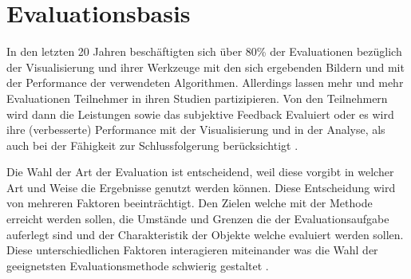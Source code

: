 \documentclass[draft=false
              ,paper=a4
              ,twoside=false
              ,fontsize=11pt
              ,headsepline
              ,BCOR10mm
              ,DIV11
              ]{scrbook}
\newcommand{\TODO}[1]{\colorbox{yellow}{\textcolor{red}{[TODO: #1]}}}
\begin{document}
%

\chapter{Evaluationsbasis} %
\label{cha:evaluationsbasis}
In den letzten 20 Jahren beschäftigten sich über 80\% der Evaluationen bezüglich der Visualisierung und ihrer Werkzeuge mit den sich ergebenden Bildern und mit der Performance der verwendeten Algorithmen. Allerdings lassen mehr und mehr Evaluationen Teilnehmer in ihren Studien partizipieren. Von den Teilnehmern wird dann die Leistungen sowie das subjektive Feedback Evaluiert oder es wird ihre (verbesserte) Performance mit der Visualisierung und in der Analyse, als auch bei der Fähigkeit zur Schlussfolgerung berücksichtigt \cite{isenberg_systematic_2013}. 

Die Wahl der Art der Evaluation ist entscheidend, weil diese vorgibt in welcher Art und Weise die Ergebnisse genutzt werden können. Diese Entscheidung wird von mehreren Faktoren beeinträchtigt. Den Zielen welche mit der Methode erreicht werden sollen, die Umstände und Grenzen die der Evaluationsaufgabe auferlegt sind und der Charakteristik der Objekte welche evaluiert werden sollen. Diese unterschiedlichen Faktoren interagieren miteinander was die Wahl der geeignetsten Evaluationsmethode schwierig gestaltet \cite{kitchenham_evaluating_1996-2}.
\end{document}
